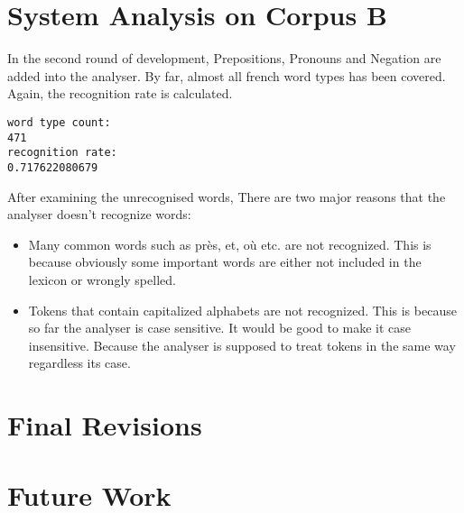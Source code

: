\documentclass[11pt,letterpaper]{article}
\begin{document}
\section{System Analysis on Corpus B}
In the second round of development, Prepositions, Pronouns and Negation are added into the analyser. By far, almost all french word types has been covered. Again, the recognition rate is calculated.\\

\begin{verbatim}
word type count:
471
recognition rate:
0.717622080679
\end{verbatim} 
After examining the unrecognised words, There are two major reasons that the analyser doesn't recognize words:\\
\begin{itemize}
\item Many common words such as pr\`es, et, o\`u etc. are not recognized. This is because obviously some important words are either not included in the lexicon or wrongly spelled.
\item Tokens that contain capitalized alphabets are not recognized. This is because so far the analyser is case sensitive. It would be good to make it case insensitive. Because the analyser is supposed to treat tokens in the same way regardless its case.
\end{itemize}
\section{Final Revisions}

\section{Future Work}



\label{lastpage}
\end{document}
